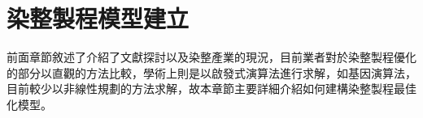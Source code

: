 \chapter{染整製程模型建立}
\label{c:model}
前面章節敘述了介紹了文獻探討以及染整產業的現況，目前業者對於染整製程優化的部分以直觀的方法比較，學術上則是以啟發式演算法進行求解，如基因演算法\cite{Wu.etc}，目前較少以非線性規劃的方法求解，故本章節主要詳細介紹如何建構染整製程最佳化模型。